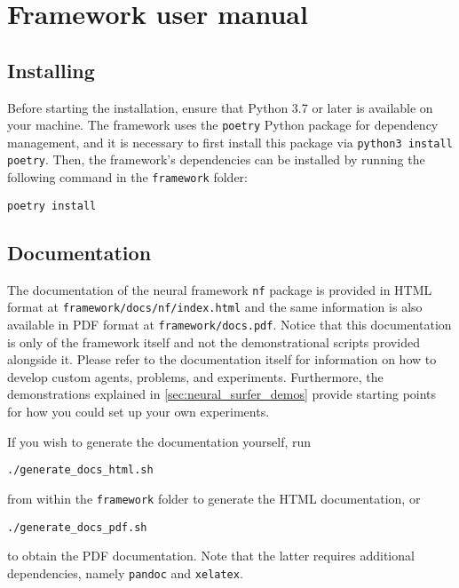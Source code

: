 \chapter{Framework user manual}
\label{app:framework_user_manual}

\section{Installing}
Before starting the installation, ensure that Python 3.7 or later is available on your machine. 
The framework uses the \texttt{poetry} Python package for dependency management, and it is necessary to first install this package via \texttt{python3 install poetry}. 
Then, the framework's dependencies can be installed by running the following command in the \texttt{framework} folder:
\begin{verbatim}
poetry install
\end{verbatim}

\section{Documentation}
The documentation of the neural framework \texttt{nf} package is provided in HTML format at \texttt{framework/docs/nf/index.html} and the same information is also available in PDF format at \texttt{framework/docs.pdf}.
Notice that this documentation is only of the framework itself and not the demonstrational scripts provided alongside it.
Please refer to the documentation itself for information on how to develop custom agents, problems, and experiments. 
Furthermore, the demonstrations explained in \ref{sec:neural_surfer_demos} provide starting points for how you could set up your own experiments.

If you wish to generate the documentation yourself, run
\begin{verbatim}
./generate_docs_html.sh
\end{verbatim}
from within the \texttt{framework} folder to generate the HTML documentation, or
\begin{verbatim}
./generate_docs_pdf.sh
\end{verbatim}
to obtain the PDF documentation. 
Note that the latter requires additional dependencies, namely \texttt{pandoc} and \texttt{xelatex}.


